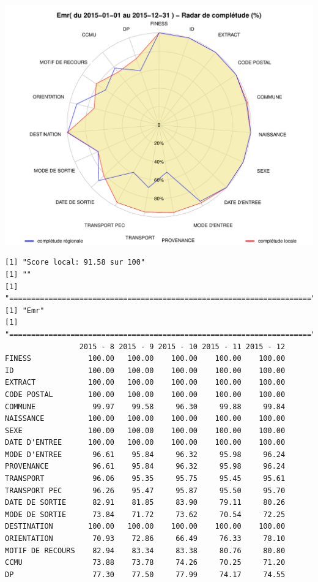 \documentclass[]{article}
\begin{document}
\includegraphics{completude_files/figure-latex/finess-17.pdf}

\begin{verbatim}
[1] "Score local: 91.58 sur 100"
[1] ""
[1] "====================================================================="
[1] "Emr"
[1] "====================================================================="
                 2015 - 8 2015 - 9 2015 - 10 2015 - 11 2015 - 12
FINESS             100.00   100.00    100.00    100.00    100.00
ID                 100.00   100.00    100.00    100.00    100.00
EXTRACT            100.00   100.00    100.00    100.00    100.00
CODE POSTAL        100.00   100.00    100.00    100.00    100.00
COMMUNE             99.97    99.58     96.30     99.88     99.84
NAISSANCE          100.00   100.00    100.00    100.00    100.00
SEXE               100.00   100.00    100.00    100.00    100.00
DATE D'ENTREE      100.00   100.00    100.00    100.00    100.00
MODE D'ENTREE       96.61    95.84     96.32     95.98     96.24
PROVENANCE          96.61    95.84     96.32     95.98     96.24
TRANSPORT           96.06    95.35     95.75     95.45     95.61
TRANSPORT PEC       96.26    95.47     95.87     95.50     95.70
DATE DE SORTIE      82.91    81.85     83.90     79.11     80.26
MODE DE SORTIE      73.84    71.72     73.62     70.54     72.25
DESTINATION        100.00   100.00    100.00    100.00    100.00
ORIENTATION         70.93    72.86     66.49     76.33     78.10
MOTIF DE RECOURS    82.94    83.34     83.38     80.76     80.80
CCMU                73.88    73.78     74.26     70.25     71.20
DP                  77.30    77.50     77.99     74.17     74.55
\end{verbatim}
\end{document}
